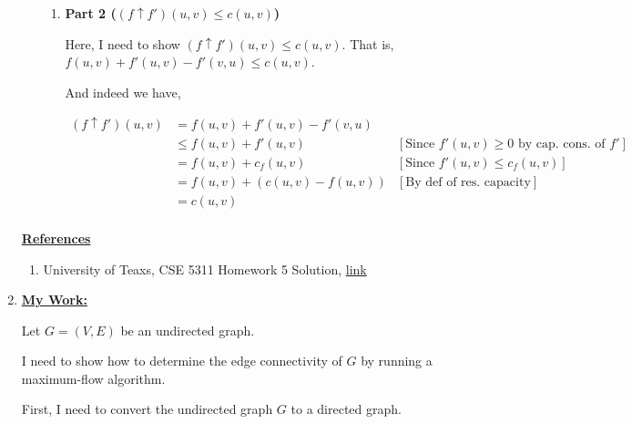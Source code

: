 \documentclass[12pt]{article}
\begin{document}
\begin{enumerate}[1.]
\begin{itemize}
\begin{enumerate}[1.]
            \item \textbf{Part 2 ($(f \uparrow f')(u,v) \leq c(u,v)$)}

            Here, I need to show $(f \uparrow f')(u,v) \leq c(u,v)$. That is,
            $f(u,v) + f'(u,v) - f'(v,u) \leq c(u,v)$.

            \bigskip

            And indeed we have,

            \begin{align}
            (f \uparrow f')(u,v) &= f(u,v)+ f'(u,v) - f'(v,u)\\
            &\leq f(u,v)+ f'(u,v) & [\text{Since $f'(u,v) \geq 0$ by cap. cons. of $f'$}]\\
            &= f(u,v)+ c_f(u,v) & [\text{Since $f'(u,v) \leq c_f(u,v)$}]\\
            &= f(u,v) + (c(u,v) - f(u,v)) & [\text{By def of res. capacity}]\\
            &= c(u,v)\\
            \end{align}

        \end{enumerate}

    \end{itemize}

    \bigskip

    \underline{\textbf{References}}

    \bigskip

    \begin{enumerate}[1)]
        \item University of Teaxs, CSE 5311 Homework 5 Solution, \href{http://ranger.uta.edu/~huang/teaching/CSE5311/HW5_Solution.pdf}{link}
    \end{enumerate}

    \item
    \setcounter{equation}{0}
    \bigskip

    \begin{mdframed}
    \underline{\textbf{My Work:}}

    Let $G=(V,E)$ be an undirected graph.

    \bigskip

    I need to show how to determine the edge connectivity of $G$ by running a
    maximum-flow algorithm.

    \bigskip

    First, I need to convert the undirected graph $G$ to a directed graph.


\end{mdframed}
\end{enumerate}
\end{document}
